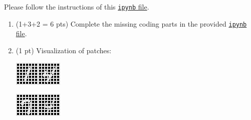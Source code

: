 \documentclass[10pt]{article}
\begin{document}
\begin{exercise}
	Please follow the instructions of this \href{https://cs.uwaterloo.ca/~y328yu/mycourses/480/a3-vit.ipynb}{\texttt{ipynb} file}.

	\begin{enumerate}
		\item (1+3+2 = 6 pts) Complete the missing coding parts in the provided \href{https://cs.uwaterloo.ca/~y328yu/mycourses/480/a3-vit.ipynb}{\texttt{ipynb} file}.

		\item (1 pt) Visualization of patches:

		      \includegraphics[width=.45\textwidth]{img/img_grid_0.png}\includegraphics[width=.45\textwidth]{img/img_grid_1.png}

		      \includegraphics[width=.45\textwidth]{img/img_grid_2.png}\includegraphics[width=.45\textwidth]{img/img_grid_3.png}


\end{enumerate}
\end{exercise}
\end{document}
